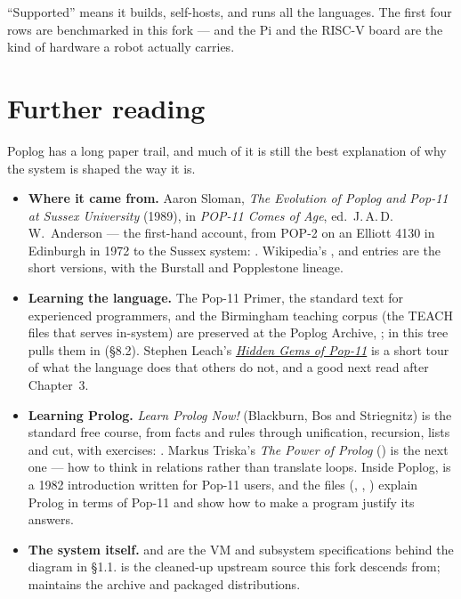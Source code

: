 ``Supported'' means it builds, self-hosts, and runs all the languages. The
first four rows are benchmarked in this fork --- and the Pi and the RISC-V
board are the kind of hardware a robot actually carries.

\section{Further reading}

Poplog has a long paper trail, and much of it is still the best explanation
of why the system is shaped the way it is.

\begin{itemize}
\item \textbf{Where it came from.} Aaron Sloman, \emph{The Evolution of
  Poplog and Pop-11 at Sussex University} (1989), in \emph{POP-11 Comes of
  Age}, ed.\ J.\,A.\,D.\,W.\ Anderson --- the first-hand account, from
  POP-2 on an Elliott 4130 in Edinburgh in 1972 to the Sussex system:
  \href{https://cogaffarchive.org/sloman.pop11.pdf}{}.
  Wikipedia's \href{https://en.wikipedia.org/wiki/POP-2}{},
  \href{https://en.wikipedia.org/wiki/POP-11}{} and
  \href{https://en.wikipedia.org/wiki/Poplog}{} entries are
  the short versions, with the Burstall and Popplestone lineage.
\item \textbf{Learning the language.} The Pop-11 Primer, the standard text
  for experienced programmers, and the Birmingham teaching corpus (the
  TEACH files that  serves in-system) are preserved at the Poplog
  Archive, \href{https://poplogarchive.getpoplog.org/}{};
   in this tree pulls them in (\S8.2).
  Stephen Leach's \href{https://github.com/sfkleach/hidden-gems-of-pop11}{\emph{Hidden
  Gems of Pop-11}} is a short tour of what the language does that others do
  not, and a good next read after Chapter~3.
\item \textbf{Learning Prolog.} \emph{Learn Prolog Now!} (Blackburn, Bos
  and Striegnitz) is the standard free course, from facts and rules through
  unification, recursion, lists and cut, with exercises:
  \href{https://lpn.swi-prolog.org/lpnpage.php?pageid=online}{}.
  Markus Triska's \emph{The Power of Prolog}
  (\href{https://www.metalevel.at/prolog}{}) is
  the next one --- how to think in relations rather than translate loops.
  Inside Poplog,  is a 1982 introduction written for
  Pop-11 users, and the  files
  (, , ) explain Prolog in terms
  of Pop-11 and show how to make a program justify its answers.
\item \textbf{The system itself.}  and 
  are the VM and subsystem specifications behind the diagram in \S1.1.
  \href{https://github.com/hebisch/poplog}{} is the
  cleaned-up upstream source this fork descends from;
  \href{https://github.com/GetPoplog}{} maintains the archive
  and packaged distributions.
\end{itemize}
